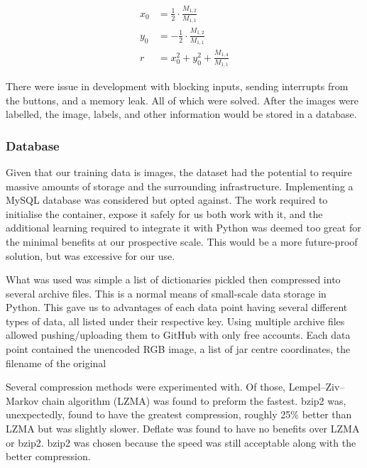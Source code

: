 \documentclass[11pt]{article}
\begin{document}
                \begin{align}
                    x_0 &= \frac{1}{2} \cdot \frac{M_{1,2}}{M_{1,1}} \label{eq:x_0}\\
                    y_0 &= -\frac{1}{2} \cdot \frac{M_{1,2}}{M_{1,1}} \label{eq:y_0}\\
                    r   &= x_0^2 + y_0^2 + \frac{M_{1,4}}{M_{1,1}} \label{eq:r}
                \end{align}

                There were issue in development with blocking inputs, sending interrupts from the buttons, and a memory leak. All of which were solved. After the images were labelled, the image, labels, and other information would be stored in a database.

            \subsubsection{Database}
                Given that our training data is images, the dataset had the potential to require massive amounts of storage and the surrounding infrastructure. Implementing a MySQL database was considered but opted against. The work required to initialise the container, expose it safely for us both work with it, and the additional learning required to integrate it with Python was deemed too great for the minimal benefits at our prospective scale. This would be a more future-proof solution, but was excessive for our use.

                What was used was simple a list of dictionaries pickled then compressed into several archive files. This is a normal means of small-scale data storage in Python. This gave us to advantages of each data point having several different types of data, all listed under their respective key. Using multiple archive files allowed pushing/uploading them to GitHub with only free accounts. Each data point contained the unencoded RGB image, a list of jar centre coordinates, the filename of the original
                
                Several compression methods were experimented with. Of those, Lempel–Ziv–Markov chain algorithm (LZMA) was found to preform the fastest. bzip2 was, unexpectedly, found to have the greatest compression, roughly 25\% better than LZMA but was slightly slower. Deflate was found to have no benefits over LZMA or bzip2. bzip2 was chosen because the speed was still acceptable along with the better compression.
\end{document}
